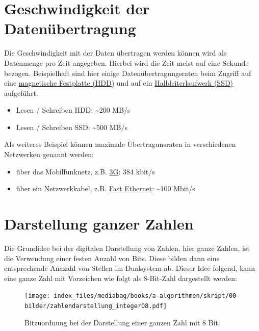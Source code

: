 \documentclass[
  letterpaper,
  DIV=11,
  numbers=noendperiod]{scrreprt}
\providecommand{\tightlist}{%
  \setlength{\itemsep}{0pt}\setlength{\parskip}{0pt}}\usepackage{longtable,booktabs,array}
\begin{document}
\section{Geschwindigkeit der
Datenübertragung}\label{geschwindigkeit-der-datenuxfcbertragung}

Die Geschwindigkeit mit der Daten übertragen werden können wird als
Datenmenge pro Zeit angegeben. Hierbei wird die Zeit meist auf eine
Sekunde bezogen. Beispielhaft sind hier einige Datenübertragungsraten
beim Zugriff auf eine
\href{https://de.wikipedia.org/wiki/Festplattenlaufwerk}{magnetische
Festplatte (HDD)} und auf ein
\href{https://de.wikipedia.org/wiki/Solid-State-Drive}{Halbleiterlaufwerk
(SSD)} aufgeführt.

\begin{itemize}
\tightlist
\item
  Lesen / Schreiben HDD: \textasciitilde200 MB/s
\item
  Lesen / Schreiben SSD: \textasciitilde500 MB/s
\end{itemize}

Als weiteres Beispiel können maximale Übertragunsraten in verschiedenen
Netzwerken genannt werden:

\begin{itemize}
\tightlist
\item
  über das Mobilfunknetz, z.B.
  \href{https://de.wikipedia.org/wiki/Mobilfunkstandard}{3G}: 384 kbit/s
\item
  über ein Netzwerkkabel, z.B.
  \href{https://de.wikipedia.org/wiki/Ethernet}{Fast Ethernet}:
  \textasciitilde100 Mbit/s
\end{itemize}

\section{Darstellung ganzer Zahlen}\label{darstellung-ganzer-zahlen}

Die Grundidee bei der digitalen Darstellung von Zahlen, hier ganze
Zahlen, ist die Verwendung einer festen Anzahl von Bits. Diese bilden
dann eine entsprechende Anazahl von Stellen im Dualsystem ab. Dieser
Idee folgend, kann eine ganze Zahl mit Vorzeichen wie folgt als
8-Bit-Zahl dargestellt werden:

\begin{figure}[H]

{\centering \texttt{[image: index\_files/mediabag/books/a-algorithmen/skript/00-bilder/zahlendarstellung\_integer08.pdf]}

}

\caption{Bitzuordnung bei der Darstellung einer ganzen Zahl mit 8 Bit.}

\end{figure}%
\end{document}
